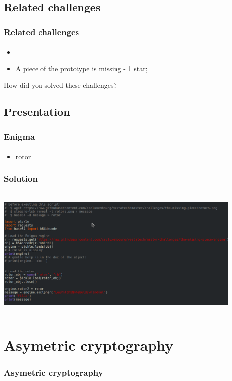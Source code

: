 \documentclass[]{beamer}
\begin{document}
\subsection{Related challenges}
\begin{frame}
\frametitle{Related challenges}
\framesubtitle{}
\begin{itemize}
    \item 
    \item \href{https://github.com/cscluxembourg/vestatech/tree/master/challenges/the-missing-piece}{A piece of the prototype is missing} - 1 star;
\end{itemize}
\bigskip
How did you solved these challenges?
\end{frame}

\subsection{Presentation}
\begin{frame}
\frametitle{Enigma}
\framesubtitle{}
\begin{itemize}
    \item rotor
\end{itemize}
\end{frame}



\begin{frame}
\frametitle{Solution}
\begin{center}
    \includegraphics[height=6.5cm, width=12.0cm]{./images/Enigma_solution.png}
\end{center}
\end{frame}






%
%
\section{Asymetric cryptography}
\begin{frame}
\frametitle{Asymetric cryptography}
\begin{columns}[t]
\begin{column}{5cm}
\tableofcontents[sections={1-3}, currentsection, hideothersubsections]
\end{column}
\begin{column}{5cm}
\tableofcontents[sections={4-5}, currentsection, hideothersubsections]
\end{column}
\end{columns}
\end{frame}
\end{document}
